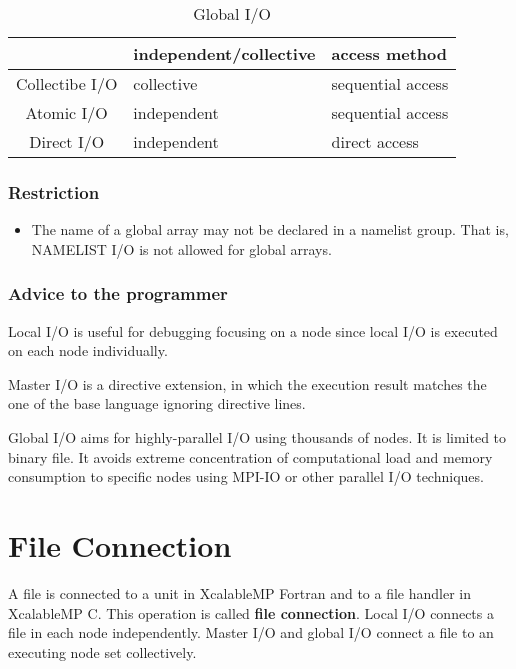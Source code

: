   \begin{table}[tb]
   \begin{center}
    \caption{Global I/O}
    \label{tb:global}
    \begin{tabular}{|c||l|l|}
     \hline 
     & independent/collective & access method  \\ \hline \hline
     Collectibe I/O & collective & sequential access \\ \hline
     Atomic I/O & independent & sequential access \\ \hline
     Direct I/O & independent & direct access \\ \hline
    \end{tabular}
   \end{center}
  \end{table}
  
  \subsubsection*{Restriction}

  \begin{itemize}
   \item  The name of a global array may not be declared in a namelist
	  group.
	  That is, NAMELIST I/O is not allowed for global arrays.
  \end{itemize}

  \subsubsection*{Advice to the programmer}

  Local I/O is useful for debugging focusing on a node since local I/O
  is executed on each node individually.

  Master I/O is a directive extension, in which the execution result
  matches the one of the base language ignoring directive lines.

  Global I/O aims for highly-parallel I/O using thousands of nodes.
  It is limited to binary file.
  It avoids extreme concentration of computational load and memory
  consumption to specific nodes using MPI-IO or other parallel I/O
  techniques.

  \section{File Connection}

  A file is connected to a unit in XcalableMP Fortran and to a file
  handler in XcalableMP C.
  This operation is called {\bf file connection}.
  Local I/O connects a file in each node independently.
  Master I/O and global I/O connect a file to an executing node set
  collectively.
  
